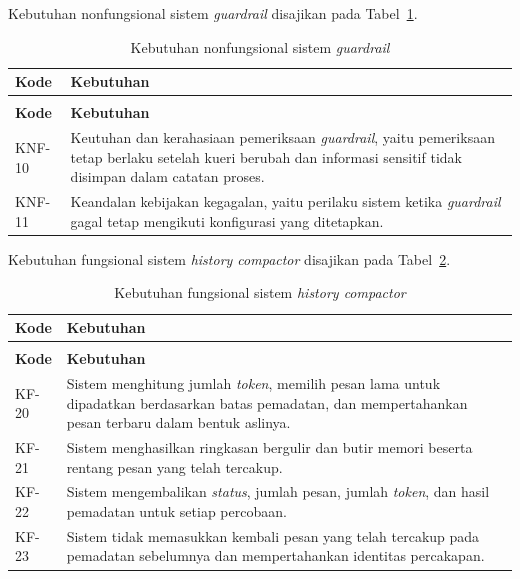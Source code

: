 \noindent Kebutuhan nonfungsional sistem \emph{guardrail} disajikan pada Tabel~\ref{tab:knf-guardrail}.

\begin{longtable}{>{\RaggedRight\arraybackslash}p{2.2cm} >{\RaggedRight\arraybackslash}p{10.65cm}}
    \caption{Kebutuhan nonfungsional sistem \emph{guardrail}}\label{tab:knf-guardrail}\\
    \toprule
    \textbf{Kode} & \textbf{Kebutuhan}\\
    \midrule
    \endfirsthead
    \multicolumn{2}{l}{\small\itshape Lanjutan Tabel \ref{tab:knf-guardrail}}\\
    \toprule
    \textbf{Kode} & \textbf{Kebutuhan}\\
    \midrule
    \endhead
    \bottomrule
    \endfoot
    KNF-10 & Keutuhan dan kerahasiaan pemeriksaan \emph{guardrail}, yaitu pemeriksaan tetap berlaku setelah kueri berubah dan informasi sensitif tidak disimpan dalam catatan proses.\\
    KNF-11 & Keandalan kebijakan kegagalan, yaitu perilaku sistem ketika \emph{guardrail} gagal tetap mengikuti konfigurasi yang ditetapkan.\\
\end{longtable}

\noindent Kebutuhan fungsional sistem \emph{history compactor} disajikan pada Tabel~\ref{tab:kf-history-compactor}.

\begin{longtable}{>{\RaggedRight\arraybackslash}p{2.2cm} >{\RaggedRight\arraybackslash}p{10.65cm}}
    \caption{Kebutuhan fungsional sistem \emph{history compactor}}\label{tab:kf-history-compactor}\\
    \toprule
    \textbf{Kode} & \textbf{Kebutuhan}\\
    \midrule
    \endfirsthead
    \multicolumn{2}{l}{\small\itshape Lanjutan Tabel \ref{tab:kf-history-compactor}}\\
    \toprule
    \textbf{Kode} & \textbf{Kebutuhan}\\
    \midrule
    \endhead
    \bottomrule
    \endfoot
    KF-20 & Sistem menghitung jumlah \emph{token}, memilih pesan lama untuk dipadatkan berdasarkan batas pemadatan, dan mempertahankan pesan terbaru dalam bentuk aslinya.\\
    KF-21 & Sistem menghasilkan ringkasan bergulir dan butir memori beserta rentang pesan yang telah tercakup.\\
    KF-22 & Sistem mengembalikan \emph{status}, jumlah pesan, jumlah \emph{token}, dan hasil pemadatan untuk setiap percobaan.\\
    KF-23 & Sistem tidak memasukkan kembali pesan yang telah tercakup pada pemadatan sebelumnya dan mempertahankan identitas percakapan.\\
\end{longtable}

